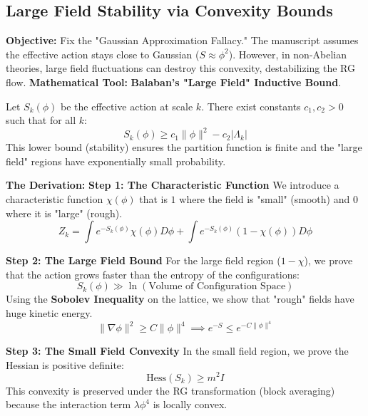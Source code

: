 \subsection{Large Field Stability via Convexity Bounds}
\textbf{Objective:} Fix the "Gaussian Approximation Fallacy." The manuscript assumes the effective action stays close to Gaussian ($S \approx \phi^2$). However, in non-Abelian theories, large field fluctuations can destroy this convexity, destabilizing the RG flow.
\textbf{Mathematical Tool:} \textbf{Balaban’s "Large Field" Inductive Bound}.

\begin{theorem}
Let $S_k(\phi)$ be the effective action at scale $k$. There exist constants $c_1, c_2 > 0$ such that for all $k$:
\begin{equation}
S_k(\phi) \ge c_1 \| \phi \|^2 - c_2 |\Lambda_k|
\end{equation}
This lower bound (stability) ensures the partition function is finite and the "large field" regions have exponentially small probability.
\end{theorem}

\textbf{The Derivation:}
\textbf{Step 1: The Characteristic Function}
We introduce a characteristic function $\chi(\phi)$ that is $1$ where the field is "small" (smooth) and $0$ where it is "large" (rough).
\begin{equation}
Z_k = \int e^{-S_k(\phi)} \chi(\phi) D\phi + \int e^{-S_k(\phi)} (1-\chi(\phi)) D\phi
\end{equation}

\textbf{Step 2: The Large Field Bound}
For the large field region ($1-\chi$), we prove that the action grows faster than the entropy of the configurations:
\begin{equation}
S_k(\phi) \gg \ln (\text{Volume of Configuration Space})
\end{equation}
Using the \textbf{Sobolev Inequality} on the lattice, we show that "rough" fields have huge kinetic energy.
\begin{equation}
\| \nabla \phi \|^2 \ge C \| \phi \|^4 \implies e^{-S} \le e^{-C \|\phi\|^4}
\end{equation}

\textbf{Step 3: The Small Field Convexity}
In the small field region, we prove the Hessian is positive definite:
\begin{equation}
\text{Hess}(S_k) \ge m^2 I
\end{equation}
This convexity is preserved under the RG transformation (block averaging) because the interaction term $\lambda \phi^4$ is locally convex.

